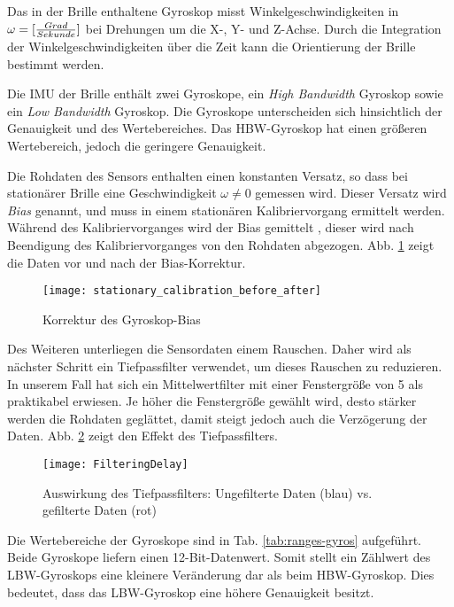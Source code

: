 Das in der Brille enthaltene Gyroskop misst Winkelgeschwindigkeiten in
$\omega = [{Grad \over Sekunde}]$ bei Drehungen um die X-, Y- und Z-Achse. Durch
die Integration der Winkelgeschwindigkeiten über die Zeit kann die
Orientierung der Brille bestimmt werden.  

Die \ac{IMU} der Brille enthält zwei
Gyroskope, ein \emph{High Bandwidth} Gyroskop sowie ein
\emph{Low Bandwidth} Gyroskop. Die Gyroskope unterscheiden sich
hinsichtlich der Genauigkeit und des Wertebereiches. Das \ac{HBW}-Gyroskop
hat einen größeren Wertebereich, jedoch die geringere
Genauigkeit.

Die Rohdaten des Sensors enthalten einen konstanten Versatz, so dass bei
stationärer Brille eine Geschwindigkeit $\omega \neq 0$ gemessen wird. Dieser
Versatz wird \emph{Bias} genannt, und muss in einem stationären
Kalibriervorgang ermittelt werden. Während des Kalibriervorganges wird
der Bias gemittelt , dieser wird nach Beendigung des Kalibriervorganges von den
Rohdaten abgezogen. Abb. \ref{fig:gyro_bias} zeigt die Daten vor und nach der
Bias-Korrektur.

\begin{figure}[h]
   \centering
   \texttt{[image: stationary\_calibration\_before\_after]}
   \caption{Korrektur des Gyroskop-Bias}
   \label{fig:gyro_bias}
\end{figure}

Des Weiteren unterliegen die Sensordaten einem Rauschen. Daher wird als
nächster Schritt ein Tiefpassfilter verwendet, um dieses Rauschen zu
reduzieren. In unserem Fall hat sich ein Mittelwertfilter mit einer 
Fenstergröße von 5 als praktikabel erwiesen. Je höher die Fenstergröße gewählt wird,
desto stärker werden die Rohdaten geglättet, damit steigt jedoch auch
die Verzögerung der Daten. Abb. \ref{fig:lowpass-delay} zeigt den Effekt des Tiefpassfilters.

\begin{figure}[h]
   \centering
   \texttt{[image: FilteringDelay]}
   \caption{Auswirkung des Tiefpassfilters: Ungefilterte Daten (blau) vs. gefilterte Daten (rot)}
   \label{fig:lowpass-delay}
\end{figure}

Die Wertebereiche der Gyroskope sind
in Tab. \ref{tab:ranges-gyros} aufgeführt. Beide Gyroskope liefern
einen 12-Bit-Datenwert. Somit stellt ein Zählwert des \ac{LBW}-Gyroskops eine
kleinere Veränderung dar als beim \ac{HBW}-Gyroskop.
Dies bedeutet, dass das \ac{LBW}-Gyroskop eine höhere Genauigkeit besitzt.

